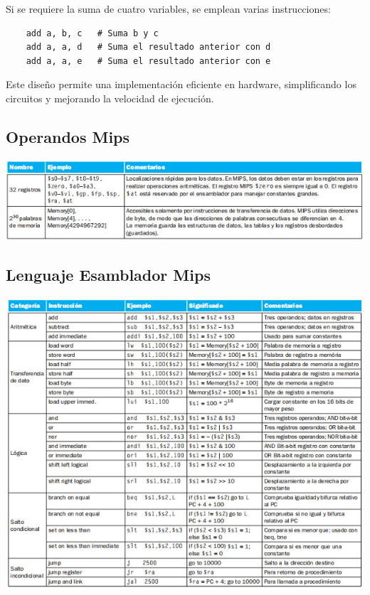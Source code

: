 \documentclass[12pt]{article}
\begin{document}
	Si se requiere la suma de cuatro variables, se emplean varias instrucciones:
	
	\begin{lstlisting}
	add a, b, c   # Suma b y c
	add a, a, d   # Suma el resultado anterior con d
	add a, a, e   # Suma el resultado anterior con e
	\end{lstlisting}
	
	Este diseño permite una implementación eficiente en hardware, simplificando los circuitos y mejorando la velocidad de ejecución.
	
	\subsection{Operandos Mips}
	
	\begin{flushleft}
	\includegraphics[width=1.2\linewidth]{OperandosMips.jpg}
	\end{flushleft}
	
	\subsection{Lenguaje Esamblador Mips}
	
	\begin{flushleft}
		\includegraphics[width=1.2\linewidth]{LenguajeEsambladorMips.jpg}
	\end{flushleft}
	
	
\end{document}
